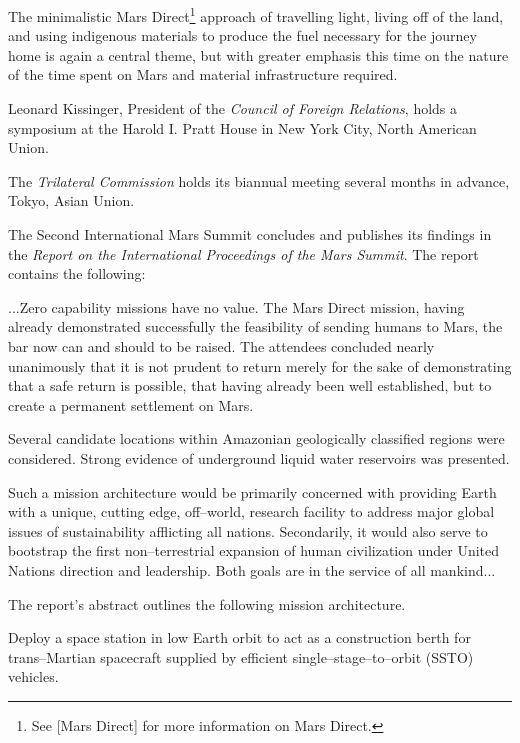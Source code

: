 The minimalistic Mars Direct\footnote{See [Mars Direct] for more information on Mars Direct.} approach of travelling light, living off of the land, and using indigenous materials to produce the fuel necessary for the journey home is again a central theme, but with greater emphasis this time on the nature of the time spent on Mars and material infrastructure required.
\StopTimelineDate

Leonard Kissinger, President of the {\it Council of Foreign Relations}, holds a symposium at the Harold I. Pratt House in New York City, North American Union.
\StopTimelineDate

The {\it Trilateral Commission} holds its biannual meeting several months in advance, Tokyo, Asian Union.
\StopTimelineDate

The Second International Mars Summit concludes and publishes its findings in the {\it Report on the International Proceedings of the Mars Summit}. The report contains the following:

\startTimelineGeneralDocument
...Zero capability missions have no value. The Mars Direct mission, having already demonstrated successfully the feasibility of sending humans to Mars, the bar now can and should to be raised. The attendees concluded nearly unanimously that it is not prudent to return merely for the sake of demonstrating that a safe return is possible, that having already been well established, but to create a permanent settlement on Mars. 

Several candidate locations within Amazonian geologically classified regions were considered. Strong evidence of underground liquid water reservoirs was presented.

Such a mission architecture would be primarily concerned with providing Earth with a unique, cutting edge, off--world, research facility to address major global issues of sustainability afflicting all nations. Secondarily, it would also serve to bootstrap the first non--terrestrial expansion of human civilization under United Nations direction and leadership. Both goals are in the service of all mankind...
\stopTimelineGeneralDocument

The report's abstract outlines the following mission architecture.

\startitemize[R]
\item Deploy a space station in low Earth orbit to act as a construction berth for trans--Martian spacecraft supplied by efficient single--stage--to--orbit (SSTO) vehicles.

